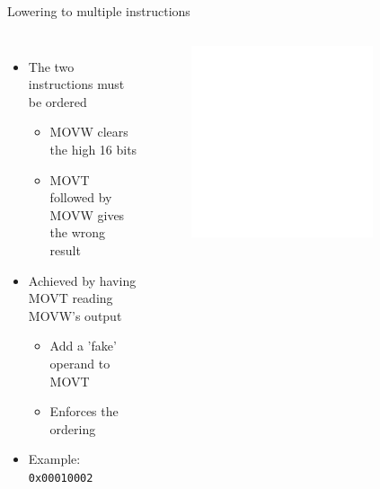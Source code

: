 
\begin{frame}{Lowering to multiple instructions}

\begin{columns}[t]
    \begin{itemize}
        \item The two instructions must be ordered
        \begin{itemize}
            \item MOVW clears the high 16 bits
            \item MOVT followed by MOVW gives the wrong result
        \end{itemize}
        \item Achieved by having MOVT reading MOVW's output
        \begin{itemize}
            \item Add a 'fake' operand to MOVT
            \item Enforces the ordering
        \end{itemize}
        \item Example: \texttt{0x00010002}
    \end{itemize}
    \begin{figure}
        \vspace{-5ex}
        \includegraphics[width = 0.78\textwidth]{examples/ex5/ex5-post-isel.pdf}
    \end{figure}
\end{columns}

\end{frame}

